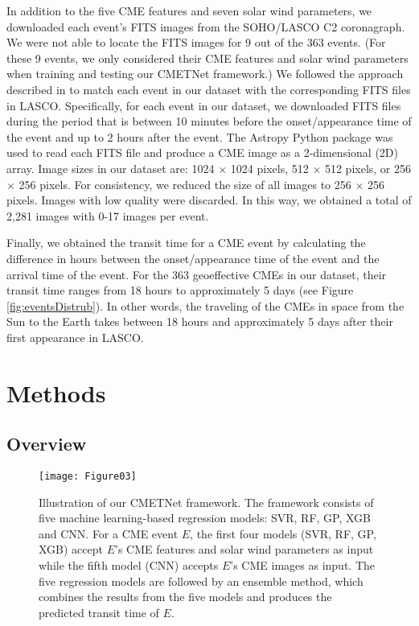 \documentclass{article}
\begin{document}
In addition to the five CME features and seven solar wind parameters,
we downloaded each event's FITS images from the
SOHO/LASCO C2 coronagraph.
We were not able to locate the FITS images for 9
out of the 363 events.
(For these 9 events, we only considered their 
CME features and solar wind parameters when training and testing
our CMETNet framework.)
We followed the approach described in  \citet{2019ApJ...881...15W} 
to match each event in our dataset
with the corresponding FITS files in LASCO.
Specifically, 
for each event in our dataset, we downloaded FITS files
during the period that is between 10 minutes 
before the onset/appearance time of the event and
up to 2 hours after the event. 
The Astropy Python package \citep{2013A&A...558A..33A} 
was used to read each FITS file and produce a CME image as a 2-dimensional (2D) array. 
Image sizes in our dataset are: 
1024 $\times$ 1024 pixels, 
512 $\times$ 512 pixels, or 
256 $\times$ 256 pixels. 
For consistency, we reduced the size of all images 
to 256 $\times$ 256 pixels. 
Images with low quality were discarded. 
In this way, we obtained a total of 2,281 images with 
0-17 images per event.

Finally, we obtained the transit time for a CME event by
calculating the difference in hours
between the onset/appearance time of the event and the arrival time of the event. 
For the 363 geoeffective CMEs in our dataset,
their transit time ranges from 18 hours to approximately 5 days (see Figure \ref{fig:eventsDistrub}).
In other words, the traveling of the CMEs in space from the Sun to the Earth
 takes between 18 hours and approximately 5 days after their first appearance in LASCO. 

\section{Methods} 
\label{sec:method}

\subsection{Overview}
\label{subsec:overview}

\begin{figure*}
\begin{center}
\texttt{[image: Figure03]}
\end{center}
\caption{Illustration of our CMETNet framework. 
The framework consists of five 
machine learning-based regression models: SVR, RF, GP, XGB and CNN. 
For a CME event $E$,
the first four models (SVR, RF, GP, XGB) accept 
$E$'s CME features and solar wind parameters as input while the
fifth model (CNN) accepts $E$'s CME images as input.
The five regression models are followed by an ensemble method,
which combines the results from the five models and
produces the predicted transit time of $E$.}
\label{fig:model}
\end{figure*}
\end{document}
